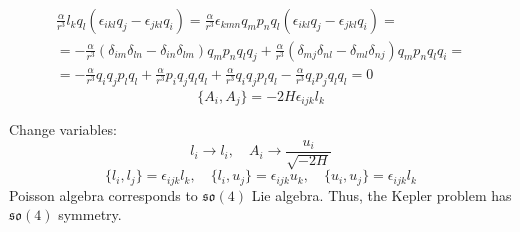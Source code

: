 \documentclass[12pt]{article}
\theoremstyle{definition}
\begin{document}
\begin{enumerate}
\begin{itemize}
\begin{itemize}
\begin{multline}
            \end{multline}
            \begin{multline}
                \frac{\alpha}{r^3}l_kq_l(\epsilon_{ikl}q_j-\epsilon_{jkl}q_i)=\frac{\alpha}{r^3}\epsilon_{kmn}q_mp_nq_l(\epsilon_{ikl}q_j-\epsilon_{jkl}q_i)=\\=-\frac{\alpha}{r^3}(\delta_{im}\delta_{ln}-\delta_{in}\delta_{lm})q_mp_nq_lq_j+\frac{\alpha}{r^3}(\delta_{mj}\delta_{nl}-\delta_{ml}\delta_{nj})q_mp_nq_lq_i=\\=-\frac{\alpha}{r^3}q_iq_jp_lq_l+\frac{\alpha}{r^3}p_iq_jq_lq_l+\frac{\alpha}{r^3}q_iq_jp_lq_l-\frac{\alpha}{r^3}q_ip_jq_lq_l=0
            \end{multline}
            \begin{equation}
                \boxed{\{A_i,A_j\}=-2H\epsilon_{ijk}l_k}
            \end{equation}
         \end{itemize}
         Change variables:
         \begin{equation}
             l_i\rightarrow l_i,\quad A_i\rightarrow\frac{u_i}{\sqrt{-2H}}
         \end{equation}
         \begin{equation}
             \boxed{\{l_i,l_j\}=\epsilon_{ijk}l_k,\quad\{l_i,u_j\}=\epsilon_{ijk}u_k,\quad\{u_i,u_j\}=\epsilon_{ijk}l_k}
         \end{equation}
         Poisson algebra corresponds to $\mathfrak{so}(4)$ Lie algebra. Thus, the Kepler problem has $\mathfrak{so}(4)$ symmetry.
    \end{itemize}
\end{enumerate}
\end{document}
